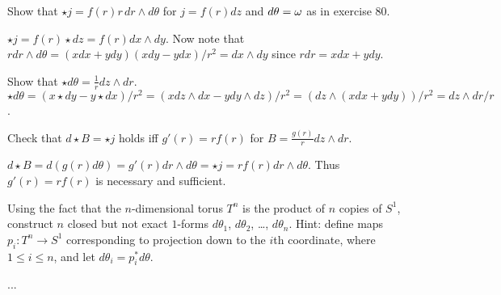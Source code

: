 \begin{p}%
{Show that $\star j=f(r)r\,dr\wedge d\theta$ for $j=f(r)dz$ and $d\theta=\omega$ as in exercise 80.}
\end{p}
{$\star j=f(r)\star dz=f(r)dx\wedge dy$. Now note that $r dr\wedge d\theta=(xdx+ydy)(xdy-ydx)/r^2=dx\wedge dy$ since $r dr=xdx+ydy$.}

\begin{p}%
{Show that $\star d\theta=\frac{1}{r}dz\wedge dr$.}{$\star d\theta=(x\star dy-y\star dx)/r^2=(xdz\wedge dx-ydy\wedge dz)/r^2=(dz\wedge(xdx+ydy))/r^2=dz\wedge dr/r$.}
\end{p}

\begin{p}%
{Check that $d\star B=\star j$ holds iff $g'(r)=rf(r)$ for $B=\frac{g(r)}{r} dz\wedge dr$.}
\end{p}
{$d\star B=d(g(r)d\theta)=g'(r)dr\wedge d\theta=\star j=rf(r)dr\wedge d\theta.$ Thus $g'(r)=rf(r)$ is necessary and sufficient.}

\begin{p}%
Using the fact that the $n$-dimensional torus $T^n$ is the product of $n$ copies of $S^1$, construct $n$ closed but not exact $1$-forms $d\theta_1$, $d\theta_2$, \dots, $d\theta_n$. Hint: define maps $p_i:T^n\to S^1$ corresponding to projection down to the $i$th coordinate, where $1\leq i\leq n$, and let $d\theta_i=p_i^*d\theta$.
\end{p}
...


\begin{p}
\end{p}


\begin{p}
\end{p}


\begin{p}
\end{p}


\begin{p}
\end{p}


\begin{p}
\end{p}


\begin{p}
\end{p}


\begin{p}
\end{p}


\begin{p}%
\end{p}


